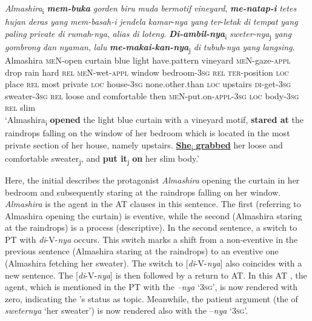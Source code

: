 \documentclass[output=paper
,modfonts
,nonflat]{langsci/langscibook}
\begin{document}
\begin{exe}
	\ex\label{e:djenar:21}
	\gll \textit{Almashira}\textsubscript{i} \textbf{\textit{mem-buka}} \textit{gorden} \textit{biru} \textit{muda} \textit{bermotif} \textit{vineyard},   \textbf{\textit{me-natap-i}} \textit{tetes} \textit{hujan} \textit{deras} \textit{yang} \textit{mem-basah-i} \textit{jendela} \textit{kamar}-\textit{nya} \textit{yang} \textit{ter}-\textit{letak} \textit{di} \textit{tempat} \textit{yang} \textit{paling} \textit{private} \textit{di} \textit{rumah}-\textit{nya}, \textit{alias} \textit{di} \textit{loteng}. \textbf{\textit{Di-ambil-nya}}\textsubscript{i} \textit{sweter-nya}\textsubscript{j} \textit{yang} \textit{gombrong} \textit{dan} \textit{nyaman}, \textit{lalu} \textbf{\textit{me-makai-kan-nya}}\textsubscript{j} \textit{di} \textit{tubuh}-\textit{nya} \textit{yang} \textit{langsing}.\\
	Almashira \textsc{meN}-open curtain blue light have.pattern vineyard \textsc{meN}-gaze-\textsc{appl} drop rain hard \textsc{rel} \textsc{meN}-wet-\textsc{appl} window bedroom-3\textsc{sg} \textsc{rel} \textsc{ter}-position \textsc{loc} place \textsc{rel} most private \textsc{loc} house-3\textsc{sg} none.other.than \textsc{loc} upstairs \textsc{di}-get-3\textsc{sg} sweater-3\textsc{sg} \textsc{rel} loose    and comfortable then \textsc{meN}-put.on-\textsc{appl}-3\textsc{sg} \textsc{loc} body-3\textsc{sg} \textsc{rel} slim\\
	\glt ‘Almashira\textsubscript{i} \textbf{opened} the light blue curtain with a vineyard motif, \textbf{stared at} the raindrops falling on the window of her bedroom which is located in the most private section of her house, namely upstairs. \uline{\textbf{She}\textsubscript{i} \textbf{grabbed}} her loose and comfortable sweater\textsubscript{j}, and \textbf{put it}\textsubscript{j} \textbf{on} her slim body.’ \citep[7]{Karina2008}
\end{exe}

\noindent
Here, the initial  describes the protagonist \textit{Almashira} opening the curtain in her bedroom and subsequently staring at the raindrops falling on her window. \textit{Almashira} is the agent in the AT clauses in this sentence. The first  (referring to Almashira opening the curtain) is eventive, while the second (Almashira staring at the raindrops) is a process (descriptive). In the second sentence, a switch to PT with \textit{di}-V-\textit{nya} occurs. This switch marks a shift from a non-eventive  in the previous sentence (Almashira staring at the raindrops) to an eventive one (Almashira fetching her sweater). The switch to [\textit{di}-V-\textit{nya}] also coincides with a new sentence. The [\textit{di}-V-\textit{nya}]  is then followed by a return to AT. In this AT , the agent, which is mentioned in the PT  with the  \textit{–nya} ‘\textsc{3sg}’, is now rendered with zero, indicating the ’s status as topic. Meanwhile, the patient argument (the  of \textit{sweternya} ‘her sweater’) is now rendered also with the  –\textit{nya} ‘\textsc{3sg}’. 
\end{document}
